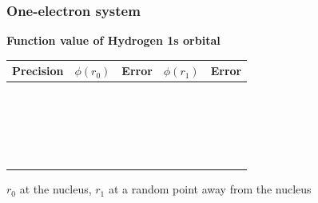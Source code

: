 \begin{frame}
\frametitle{One-electron system}
\centering
\scriptsize
\begin{table}
\textbf{Function value of Hydrogen 1s orbital}
\begin{tabular}{cclcl}
\hline
\hline
\multicolumn{1}{c}{\textbf{Precision}}&
\multicolumn{1}{c}{$\phi(r_0)$}&
\multicolumn{1}{l}{Error}&
\multicolumn{1}{c}{$\phi(r_1)$}&
\multicolumn{1}{l}{Error}\\
\hline
\hspace{10mm}\ &\hspace{20mm}\     &\hspace{15mm}\  &\hspace{20mm}\      &\hspace{10mm}\  \\
               &                   &                &                    &                \\
               &                   &                &                    &                \\
               &                   &                &                    &                \\
               &                   &                &                    &                \\
               &                   &                &                    &                \\
               &                   &                &                    &                \\
               &                   &                &                    &                \\
               &                   &                &                    &                \\
               &                   &                &                    &                \\
               &                   &                &                    &                \\
               &                   &                &                    &                \\
               &                   &                &                    &                \\
               &                   &                &                    &                \\
               &                   &                &                    &                \\
               &                   &                &                    &                \\
               &                   &                &                    &                \\
\hline
\hline
\end{tabular}
\end{table}
\tiny
$r_0$ at the nucleus, $r_1$ at a random point away from the nucleus
\end{frame}


